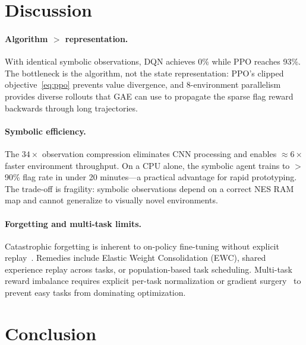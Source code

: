 \documentclass[10pt,a4paper,twocolumn]{article}
\begin{document}
\section{Discussion}

\paragraph{Algorithm $>$ representation.}
With identical symbolic observations, DQN achieves 0\% while PPO reaches
93\%. The bottleneck is the algorithm, not the state representation:
PPO's clipped objective~\eqref{eq:ppo} prevents value divergence, and
8-environment parallelism provides diverse rollouts that GAE can use to
propagate the sparse flag reward backwards through long trajectories.

\paragraph{Symbolic efficiency.}
The $34\!\times$ observation compression eliminates CNN processing and
enables $\approx\!6\!\times$ faster environment throughput.
On a CPU alone, the symbolic agent trains to $>$90\% flag rate in under
20 minutes---a practical advantage for rapid prototyping.
The trade-off is fragility: symbolic observations depend on a correct NES
RAM map and cannot generalize to visually novel environments.

\paragraph{Forgetting and multi-task limits.}
Catastrophic forgetting is inherent to on-policy fine-tuning without
explicit replay~\cite{kirkpatrick2017overcoming}.
Remedies include Elastic Weight Consolidation (EWC), shared experience
replay across tasks, or population-based task scheduling.
Multi-task reward imbalance requires explicit per-task normalization or
gradient surgery~\cite{yu2020gradient} to prevent easy tasks from
dominating optimization.

\section{Conclusion}
\end{document}
